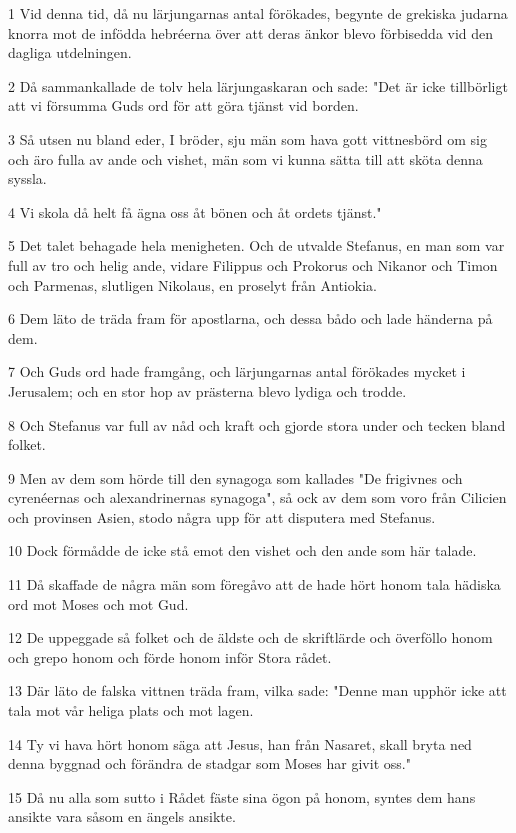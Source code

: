 \par 1 Vid denna tid, då nu lärjungarnas antal förökades, begynte de grekiska judarna knorra mot de infödda hebréerna över att deras änkor blevo förbisedda vid den dagliga utdelningen.
\par 2 Då sammankallade de tolv hela lärjungaskaran och sade: "Det är icke tillbörligt att vi försumma Guds ord för att göra tjänst vid borden.
\par 3 Så utsen nu bland eder, I bröder, sju män som hava gott vittnesbörd om sig och äro fulla av ande och vishet, män som vi kunna sätta till att sköta denna syssla.
\par 4 Vi skola då helt få ägna oss åt bönen och åt ordets tjänst."
\par 5 Det talet behagade hela menigheten. Och de utvalde Stefanus, en man som var full av tro och helig ande, vidare Filippus och Prokorus och Nikanor och Timon och Parmenas, slutligen Nikolaus, en proselyt från Antiokia.
\par 6 Dem läto de träda fram för apostlarna, och dessa bådo och lade händerna på dem.
\par 7 Och Guds ord hade framgång, och lärjungarnas antal förökades mycket i Jerusalem; och en stor hop av prästerna blevo lydiga och trodde.
\par 8 Och Stefanus var full av nåd och kraft och gjorde stora under och tecken bland folket.
\par 9 Men av dem som hörde till den synagoga som kallades "De frigivnes och cyrenéernas och alexandrinernas synagoga", så ock av dem som voro från Cilicien och provinsen Asien, stodo några upp för att disputera med Stefanus.
\par 10 Dock förmådde de icke stå emot den vishet och den ande som här talade.
\par 11 Då skaffade de några män som föregåvo att de hade hört honom tala hädiska ord mot Moses och mot Gud.
\par 12 De uppeggade så folket och de äldste och de skriftlärde och överföllo honom och grepo honom och förde honom inför Stora rådet.
\par 13 Där läto de falska vittnen träda fram, vilka sade: "Denne man upphör icke att tala mot vår heliga plats och mot lagen.
\par 14 Ty vi hava hört honom säga att Jesus, han från Nasaret, skall bryta ned denna byggnad och förändra de stadgar som Moses har givit oss."
\par 15 Då nu alla som sutto i Rådet fäste sina ögon på honom, syntes dem hans ansikte vara såsom en ängels ansikte.


